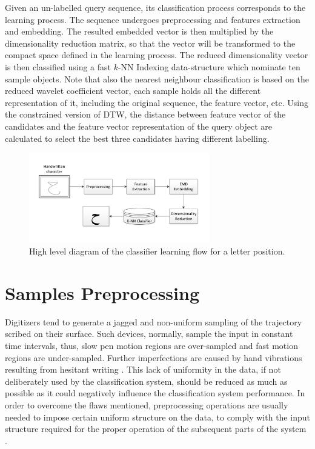 \iftoggle{edit-mode}{\hspace{0pt}\marginpar{The recognition process}}{}
Given an un-labelled query sequence, its classification process corresponds to the learning process.
The sequence undergoes preprocessing and features extraction and embedding.
The resulted embedded vector is then multiplied by the dimensionality reduction matrix, so that the vector will be transformed to the compact space defined in the learning process. 
The reduced dimensionality vector is then classified using a fast $k$-NN Indexing data-structure which nominate ten sample objects. 
Note that also the nearest neighbour classification is based on the reduced wavelet coefficient vector, each sample holds all the different representation of it, including the original sequence, the feature vector, etc. 
Using the constrained version of DTW, the distance between feature vector of the candidates and the feature vector representation of the query object are calculated to select the best three candidates having different labelling. 

\begin{figure}
\centering
\includegraphics[width=0.7\textwidth]{./figures/letters_classifier_learning_flow}       
\caption{High level diagram of the classifier learning flow for a letter position.}
\label{fig:letters_classifier_learning_flow}
\end{figure}


\newpage{}

\section{Samples Preprocessing}
\label{sec:preprocessing}

\iftoggle{edit-mode}{\hspace{0pt}\marginpar{Introduction}}{}
Digitizers tend to generate a jagged and non-uniform sampling of the trajectory scribed on their surface.
Such devices, normally, sample the input in constant time intervals, thus, slow pen motion regions are over-sampled and fast motion regions are under-sampled.
Further imperfections are caused by hand vibrations resulting from hesitant writing \cite{huang2009preprocessing}.
This lack of uniformity in the data, if not deliberately used by the classification system, should be reduced as much as possible as it could negatively influence the classification system performance.
In order to overcome the flaws mentioned, preprocessing operations are usually needed to impose certain uniform structure on the data, to comply with the input structure required for the proper operation of the subsequent parts of the system \cite{al2011online}.

